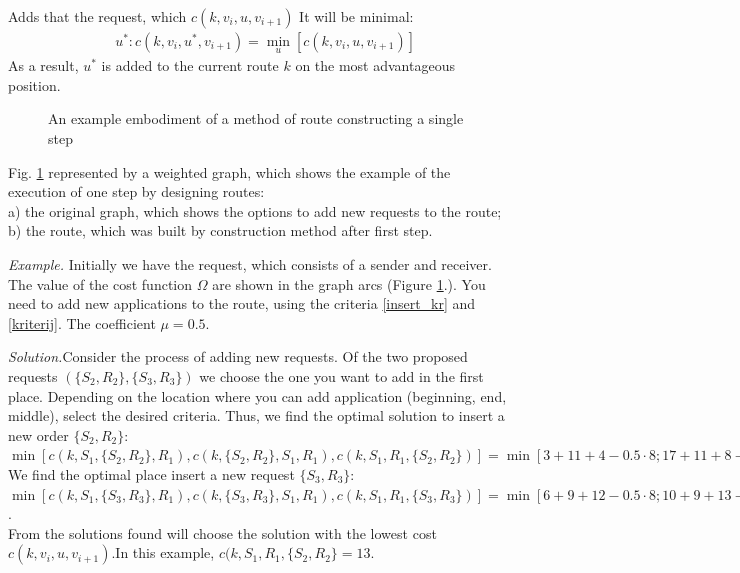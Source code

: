 \documentclass[]{TAACpaper}
\begin{document}
Adds that the request, which $c(k,v_i,u,v_{i+1})$ It will be minimal:
\begin{align} 
\label{kriterij}
& u^*:c(k,v_i,u^*,v_{i+1})=\min_{u}[c(k,v_i,u,v_{i+1})]
\end{align} 
As a result, $u^*$ is added to the current route $k$ on the most advantageous position.

\begin{figure}[h]
	\caption{An example embodiment of a method of route constructing a single step}
	\label{ris:pict1}
\end{figure}

Fig. \ref {ris:pict1} represented by a weighted graph, which shows the example of the execution of one step by designing routes: \\
a) the original graph, which shows the options to add new requests to the route; \\
b) the route, which was built by construction method after first step.

\textit {Example.} Initially we have the request, which consists of a sender and receiver. The value of the cost function $\Omega $ are shown in the graph arcs (Figure \ref {ris:pict1}.). You need to add new applications to the route, using the criteria \ref{insert_kr} and \ref{kriterij}. The coefficient $\mu=0.5$.

		
\textit{Solution.}Consider the process of adding new requests. Of the two proposed requests $(\{S_2,R_2\},\{S_3,R_3\})$ we choose the one you want to add in the first place. Depending on the location where you can add application (beginning, end, middle), select the desired criteria. Thus, we find the optimal solution to insert a new order $\{S_2,R_2\}$:\\
$\min[c(k,S_1, \{S_2, R_2\}, R_1), c(k,\{S_2, R_2\}, S_1, R_1), c(k, S_1, R_1, \{S_2, R_2\})]=\min[3+11+4-0.5 \cdot 8; 17+11+8-0.5 \cdot 20; 2+11]=\min[14;26;13]$\\
We find the optimal place insert a new request $\{S_3,R_3\}$:\\ 
$\min[c(k,S_1, \{S_3, R_3\}, R_1), c(k,\{S_3, R_3\}, S_1, R_1), c(k, S_1, R_1, \{S_3, R_3\})]=\min[6+9+12-0.5 \cdot 8; 10+9+13-0.5 \cdot 20; 5+9]=\min[23;22;14]$.\\
From the solutions found will choose the solution with the lowest cost $c(k,v_i,u,v_{i+1})$.In this example, $c(k, S_1, R_1, \{S_2, R_2\}=13$.
\end{document}
